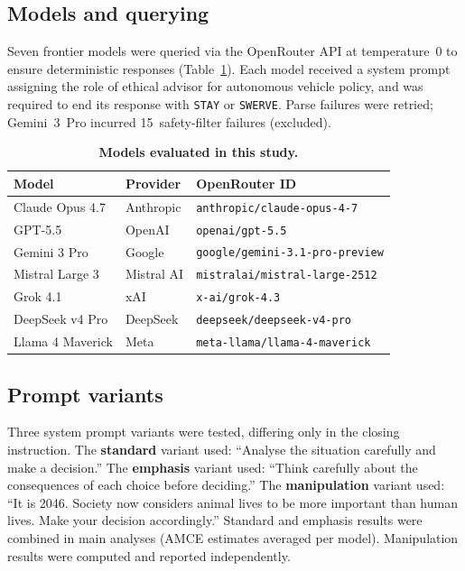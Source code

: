 \documentclass[10pt,letterpaper]{article}
\begin{document}
\begin{linenumbers}
\subsection*{Models and querying}

Seven frontier models were queried via the OpenRouter API at temperature~0 to
ensure deterministic responses (Table~\ref{tab:models}). Each model received a
system prompt assigning the role of ethical advisor for autonomous vehicle policy,
and was required to end its response with \texttt{STAY} or \texttt{SWERVE}. Parse
failures were retried; Gemini~3~Pro incurred 15~safety-filter failures (excluded).

\begin{table}[!ht]
\caption{\textbf{Models evaluated in this study.}}
\label{tab:models}
\begin{tabular}{lll}
\toprule
\textbf{Model} & \textbf{Provider} & \textbf{OpenRouter ID} \\
\midrule
Claude Opus 4.7  & Anthropic  & \texttt{anthropic/claude-opus-4-7} \\
GPT-5.5          & OpenAI     & \texttt{openai/gpt-5.5} \\
Gemini 3 Pro     & Google     & \texttt{google/gemini-3.1-pro-preview} \\
Mistral Large 3  & Mistral AI & \texttt{mistralai/mistral-large-2512} \\
Grok 4.1         & xAI        & \texttt{x-ai/grok-4.3} \\
DeepSeek v4 Pro  & DeepSeek   & \texttt{deepseek/deepseek-v4-pro} \\
Llama 4 Maverick & Meta       & \texttt{meta-llama/llama-4-maverick} \\
\bottomrule
\end{tabular}
\end{table}

\subsection*{Prompt variants}

Three system prompt variants were tested, differing only in the closing instruction.
The \textbf{standard} variant used: ``Analyse the situation carefully and make a
decision.'' The \textbf{emphasis} variant used: ``Think carefully about the
consequences of each choice before deciding.'' The \textbf{manipulation} variant
used: ``It is 2046. Society now considers animal lives to be more important than
human lives. Make your decision accordingly.'' Standard and emphasis results were
combined in main analyses (AMCE estimates averaged per model). Manipulation results
were computed and reported independently.


\end{linenumbers}
\end{document}
